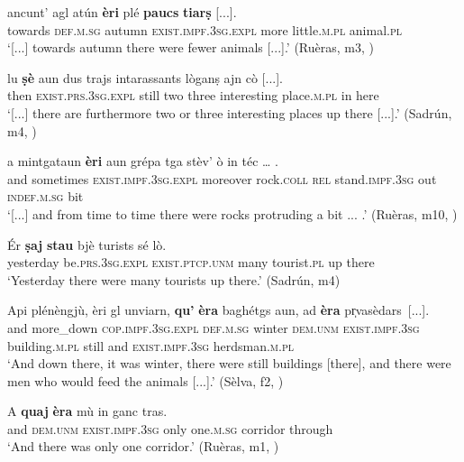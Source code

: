 \ea
\label{ex:exist.essar1}
\gll [...] ancunt’ agl atún \textbf{èri} plé \textbf{paucs} \textbf{tiarṣ} [...].\\
 {} towards \textsc{def.m.sg} autumn \textsc{exist.impf.3sg.expl} more little.\textsc{m.pl} animal.\textsc{pl} \\
\glt `[...] towards autumn there were fewer animals [...].' (Ruèras, m3, )
\z

\ea
\label{ex:exist.essar2}
\gll [...] lu \textbf{ṣè} aun dus trajs intarassants lòganṣ ajn cò [...].\\
{} then \textsc{exist.prs.3sg.expl} still two three interesting place.\textsc{m.pl} in here\\
\glt `[...] there are furthermore two or three interesting places up there [...].' (Sadrún, m4, )
\z

\ea
\label{ex:exist.essar3}
\gll   [...] a mintgataun \textbf{èri} aun grépa tga stèv’ ò in téc … . \\
{} and sometimes  \textsc{exist.impf.3sg.expl} moreover rock.\textsc{coll} \textsc{rel}  stand.\textsc{impf.3sg}  out \textsc{indef.m.sg} bit\\
\glt `[...] and from time to time there were rocks protruding a bit ... .' (Ruèras, m10, )
\z

\ea
\label{ex:exist.essar4}
\gll Ér \textbf{ṣaj} \textbf{stau} bjè turists sé lò.\\
yesterday be.\textsc{prs.3sg.expl} \textsc{exist.ptcp.unm} many tourist.\textsc{pl} up there\\
\glt `Yesterday there were many tourists up there.' (Sadrún, m4)
\z

\ea
\label{ex:exist.essar5}
\gll    Api plénèngjù, èri gl unviarn, \textbf{qu’} \textbf{èra} baghétgs aun, ad \textbf{èra} pr̩vasèdars~[...].\\
and more\_down \textsc{cop.impf.3sg.expl} \textsc{def.m.sg} winter \textsc{dem.unm} \textsc{exist.impf.3sg} building.\textsc{m.pl} still and \textsc{exist.impf.3sg} herdsman.\textsc{m.pl} \\
\glt `And down there, it was winter, there were still buildings [there], and there were men who would feed the animals [...].' (Sèlva, f2, )
\z

\ea
\label{ex:exist.essar6}
\gll    A \textbf{quaj} \textbf{èra} mù in ganc tras.\\
and \textsc{dem.unm} \textsc{exist.impf.3sg} only one.\textsc{m.sg} corridor through\\
\glt `And there was only one corridor.' (Ruèras, m1, )
\z

